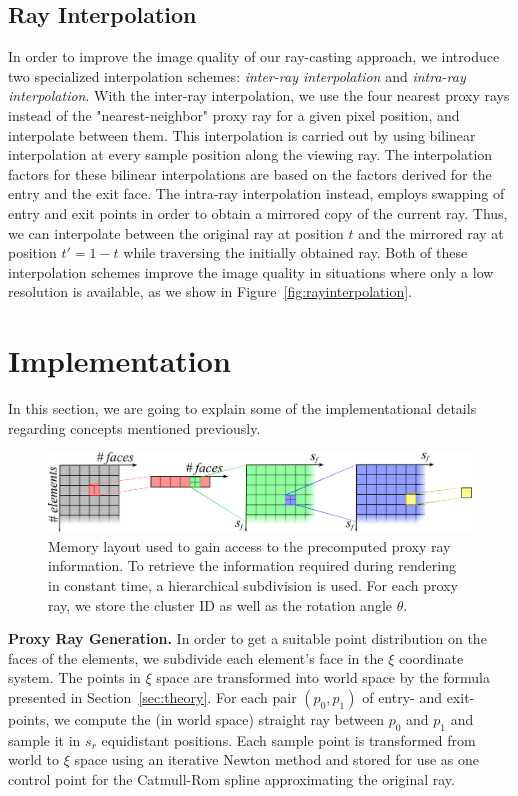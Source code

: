 \documentclass[journal]{vgtc}                %
\begin{document}
\subsection{Ray Interpolation}
In order to improve the image quality of our ray-casting approach, we introduce two specialized interpolation schemes: \emph{inter-ray interpolation} and \emph{intra-ray interpolation}. With the inter-ray interpolation, we use the four nearest proxy rays  instead of the "nearest-neighbor" proxy ray for a given pixel position, and interpolate between them. This interpolation is carried out by using bilinear interpolation at every sample position along the viewing ray. The interpolation factors for these bilinear interpolations are based on the factors derived for the entry and the exit face. The intra-ray interpolation instead, employs swapping of entry and exit points in order to obtain a mirrored copy of the current ray. Thus, we can interpolate between the original ray at position $t$ and the mirrored ray at position $t'=1-t$ while traversing the initially obtained ray. Both of these interpolation schemes improve the image quality in situations where only a low resolution is available, as we show in Figure~\ref{fig:rayinterpolation}.
%
%
%
\section{Implementation}\label{sec:implementation}
In this section, we are going to explain some of the implementational details regarding concepts  mentioned previously.
%
\begin{figure}[t]
    \centering
    \includegraphics[width=0.8\linewidth]{figures/memory_layout.pdf}
    \caption{Memory layout used to gain access to the precomputed proxy ray information. To retrieve the information required during rendering in constant time, a hierarchical subdivision is used. For each proxy ray, we store the cluster ID as well as the rotation angle $\theta$.}
    \label{fig:memory_layout}
\end{figure}
%
\noindent \textbf{Proxy Ray Generation.} In order to get a suitable point distribution on the faces of the elements, we subdivide each element's face in the $\xi$ coordinate system. The points in $\xi$ space are transformed into world space by the formula presented in Section~\ref{sec:theory}. For each pair $(p_0, p_1)$ of entry- and exit-points, we compute the (in world space) straight ray between $p_0$ and $p_1$ and sample it in $s_r$ equidistant positions. Each sample point is transformed from world to $\xi$ space using an iterative Newton method and stored for use as one control point for the Catmull-Rom spline approximating the original ray. 
\end{document}
